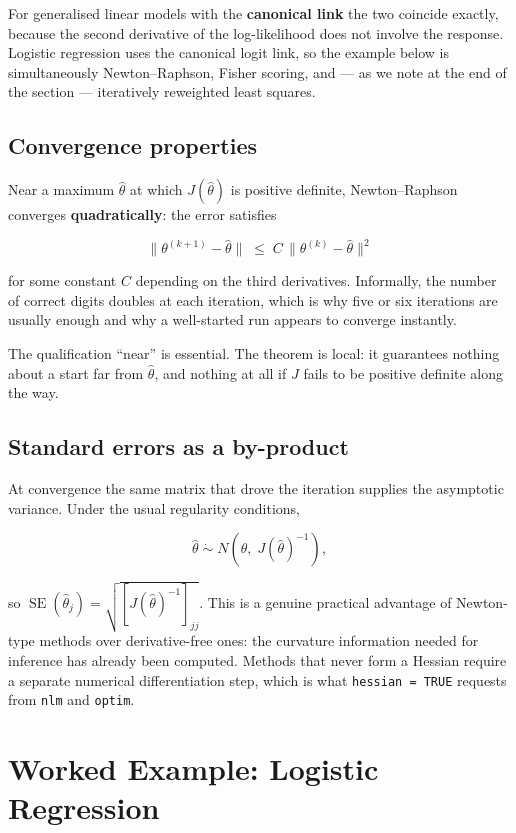 \documentclass[
  letterpaper,
  DIV=11,
  numbers=noendperiod]{scrreprt}
\begin{document}
For generalised linear models with the \textbf{canonical link} the two
coincide exactly, because the second derivative of the log-likelihood
does not involve the response. Logistic regression uses the canonical
logit link, so the example below is simultaneously Newton--Raphson,
Fisher scoring, and --- as we note at the end of the section ---
iteratively reweighted least squares.

\subsection{Convergence properties}\label{convergence-properties}

Near a maximum \(\hat\theta\) at which \(J(\hat\theta)\) is positive
definite, Newton--Raphson converges \textbf{quadratically}: the error
satisfies

\[
\|\theta^{(k+1)} - \hat\theta\| \;\le\; C \,\|\theta^{(k)} - \hat\theta\|^{2}
\]

for some constant \(C\) depending on the third derivatives. Informally,
the number of correct digits doubles at each iteration, which is why
five or six iterations are usually enough and why a well-started run
appears to converge instantly.

The qualification ``near'' is essential. The theorem is local: it
guarantees nothing about a start far from \(\hat\theta\), and nothing at
all if \(J\) fails to be positive definite along the way.

\subsection{Standard errors as a
by-product}\label{standard-errors-as-a-by-product}

At convergence the same matrix that drove the iteration supplies the
asymptotic variance. Under the usual regularity conditions,

\[
\hat\theta \;\dot\sim\; N\!\left(\theta, \; J(\hat\theta)^{-1}\right),
\]

so
\(\operatorname{SE}(\hat\theta_j) = \sqrt{[J(\hat\theta)^{-1}]_{jj}}\).
This is a genuine practical advantage of Newton-type methods over
derivative-free ones: the curvature information needed for inference has
already been computed. Methods that never form a Hessian require a
separate numerical differentiation step, which is what
\texttt{hessian\ =\ TRUE} requests from \texttt{nlm} and \texttt{optim}.

\section{Worked Example: Logistic
Regression}\label{worked-example-logistic-regression}
\end{document}
